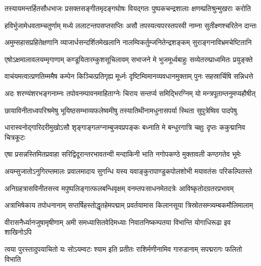 \fourlineindentedshloka
{तस्यायमन्तर्हितसौधभाजः}
{प्रसक्तसङ्गीतमृदङ्गघोषः}
{वियद्गतः पुष्पकचन्द्रशालाः}
{क्षणम्प्रतिश्रुन्मुखराः करोति} %

\fourlineindentedshloka
{हविर्भुजामेधवताम्चतुर्णाम्}
{मध्ये ललाटन्तपसप्तसप्तिः}
{असौ तपस्यत्यपरस्तपस्वी}
{नाम्ना सुतीक्ष्णश्चरितेन दान्तः} %

\fourlineindentedshloka
{अमुम्सहासप्रहितेक्षणानि}
{व्याजार्धसन्दर्शितमेखलानि}
{नालम्विकर्तुम्जनितेन्द्रशङ्कम्}
{सुराङ्गनाविभ्रमचेष्टितानि} %

\fourlineindentedshloka
{एषोऽक्षमालावलयम्मृगाणाम्}
{कण्डूयितारम्कुशसूचिलावम्}
{सभाजने मे भुजमूर्ध्वबाहुः}
{सव्येतरम्प्राध्वमितः प्रयुङ्क्ते} %

\fourlineindentedshloka
{वाचंयमत्वात्प्रणतिम्ममैष}
{कम्पेन किञ्चित्प्रतिगृह्य मूर्ध्नः}
{दृष्टिम्विमानव्यवधानमुक्ताम्}
{पुनः सहस्रार्चिषि सन्निधत्ते} %

\fourlineindentedshloka
{अदः शरण्यंशरभङ्गनाम्नः}
{तपोवनम्पावनमाहिताग्नेः}
{चिराय सन्तर्प्य समिद्भिरग्निम्}
{यो मन्त्रपूताम्तनुमप्यहौषीत्} %

\fourlineindentedshloka
{छायाविनीताध्वपरिश्रमेषु}
{भूयिष्ठसम्भाव्यफलेष्वमीषु}
{तस्यातिथीनामधुनासपर्या}
{स्थिता सुपुत्रेष्विव पादपेषु} %

\fourlineindentedshloka
{धारास्वनोद्गारिदरीमुखोऽसौ}
{शृङ्गाङ्गलग्नाम्बुजवप्रपङ्कः}
{बध्नाति मे बन्धुरगात्रि चक्षुः}
{दृप्तः ककुद्मानिव चित्रकूटः} %

\fourlineindentedshloka
{एषा प्रसन्नस्तिमितप्रवाहा}
{सरिद्विदूरान्तरभावतन्वी}
{मन्दाकिनी भाति नगोपकण्ठे}
{मुक्तावली कण्ठगतेव भूमेः} %

\fourlineindentedshloka
{अयम्सुजातोऽनुगिरम्तमालः}
{प्रवालमादाय सुगन्धि यस्य}
{यवाङ्कुरापाण्डुकपोलशोभी}
{मयावतंसः परिकल्पितस्ते} %

\fourlineindentedshloka
{अनिग्रहत्रासविनीतसत्त्व}
{मपुष्पलिङ्गात्फलबन्धिवृक्षम्}
{वनम्तपःसाधनमेतदत्रेः}
{आविष्कृतोदग्रतरप्रभावम्} %

\fourlineindentedshloka
{अत्राभिषेकाय तपोधनानाम्}
{सप्तर्षिहस्तोद्धृतहेमपद्माम्}
{प्रवर्तयामास किलानसूया}
{त्रिस्रोतसम्त्र्यम्बकमौलिमालाम्} %

\fourlineindentedshloka
{वीरासनैर्ध्यानजुषामृषीणाम्}
{अमी समध्यासितवेदिमध्याः}
{निवातनिष्कम्पतया विभान्ति}
{योगाधिरूढा इव शाखिनोऽपि} %

\fourlineindentedshloka
{त्वया पुरस्तादुपयाचितो यः}
{सोऽयम्वटः श्याम इति प्रतीतः}
{राशिर्मणीनामिव गारुडानाम्}
{सपद्मरागः फलितो विभाति} %


